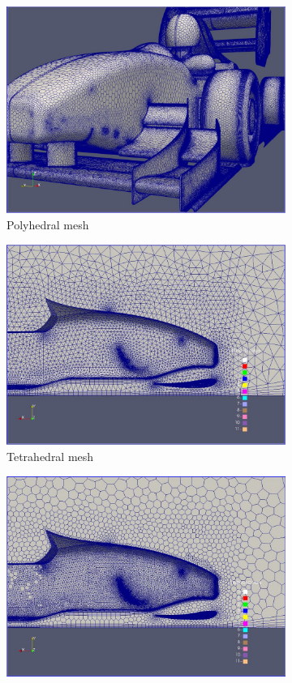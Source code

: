 \begin{figure}[h!]
    \begin{subfigure}[b]{0.46\textwidth}
    	\includegraphics[width=\textwidth]{polyhedra.JPG}
        \caption{Polyhedral mesh}
    \end{subfigure}
    \begin{subfigure}[b]{0.46\textwidth}
    \includegraphics[width=\textwidth]{tetra2.JPG}
    \caption{Tetrahedral mesh}
    \end{subfigure}
    \begin{subfigure}[b]{0.46\textwidth}
    	\includegraphics[width=\textwidth]{polyhedra2.JPG}

\end{subfigure}
\end{figure}
